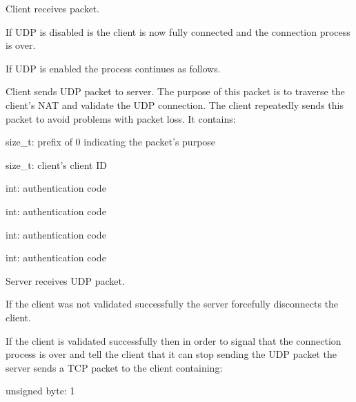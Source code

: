 \begin{DoxyItemize}
\item Client receives packet.
\item If UDP is disabled is the client is now fully connected and the connection process is over.
\item If UDP is enabled the process continues as follows.\par

\end{DoxyItemize}


\begin{DoxyItemize}
\item Client sends UDP packet to server. The purpose of this packet is to traverse the client's NAT and validate the UDP connection. The client repeatedly sends this packet to avoid problems with packet loss. It contains:
\begin{DoxyItemize}
\item size\_\-t: prefix of 0 indicating the packet's purpose
\item size\_\-t: client's client ID
\item int: authentication code
\item int: authentication code
\item int: authentication code
\item int: authentication code\par
\par

\end{DoxyItemize}
\end{DoxyItemize}


\begin{DoxyItemize}
\item Server receives UDP packet.
\item If the client was not validated successfully the server forcefully disconnects the client.
\item If the client is validated successfully then in order to signal that the connection process is over and tell the client that it can stop sending the UDP packet the server sends a TCP packet to the client containing:
\begin{DoxyItemize}
\item unsigned byte: 1\par
\par

\end{DoxyItemize}
\end{DoxyItemize}


